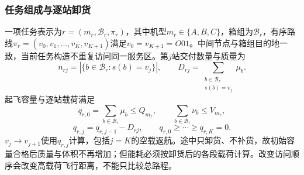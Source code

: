 \subsubsection{任务组成与逐站卸货}
一项任务表示为$r=(m_r,\mathcal B_r,\pi_r)$，其中机型$m_r\in\{A,B,C\}$，箱组为$\mathcal B_r$，有序路线$\pi_r=(v_0,v_1,\ldots,v_K,v_{K+1})$满足$v_0=v_{K+1}=O01$。中间节点与箱组目的地一致，当前任务构造不重复访问同一服务区。第$j$站交付数量与质量为
\begin{equation}
 n_{rj}=|\{b\in\mathcal B_r:s(b)=v_j\}|,\qquad
 D_{rj}=\sum_{\substack{b\in\mathcal B_r\\s(b)=v_j}}\mu_b.
\label{eq:common_drop}
\end{equation}
起飞容量与逐站载荷满足
\begin{equation}
 q_{r,0}=\sum_{b\in\mathcal B_r}\mu_b\le Q_{m_r},\qquad
 \sum_{b\in\mathcal B_r}\nu_b\le V_{m_r},
\label{eq:common_capacity}
\end{equation}
\begin{equation}
 q_{r,j}=q_{r,j-1}-D_{rj},\qquad q_{r,0}\ge\cdots\ge q_{r,K}=0.
\label{eq:common_load}
\end{equation}
$v_j\to v_{j+1}$使用$q_{r,j}$计算，包括$j=K$的空载返航。途中只卸货、不补货，故初始容量合格后质量与体积不再增加；但能耗必须按卸货后的各段载荷计算。改变访问顺序会改变高载荷飞行距离，不能只比较总路程。

